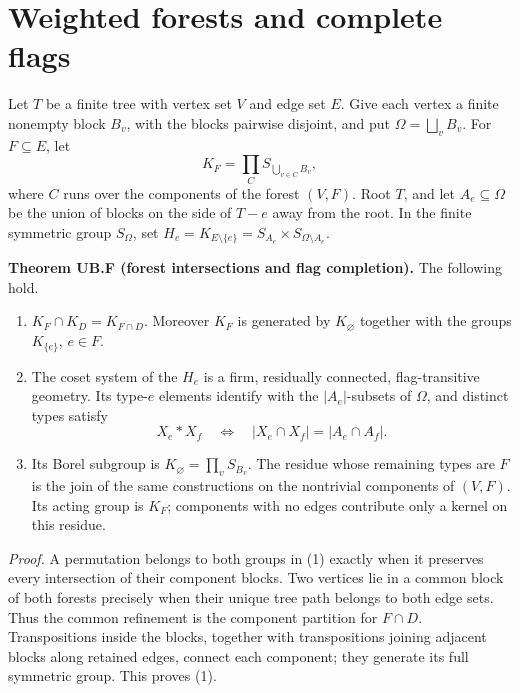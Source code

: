 \section{Weighted forests and complete flags}
Let \(T\) be a finite tree with vertex set \(V\) and edge set \(E\). Give each vertex a finite nonempty block \(B_v\), with the blocks pairwise disjoint, and put \(\Omega=\bigsqcup_vB_v\). For \(F\subseteq E\), let \begin{equation}
K_F=\prod_C S_{\bigcup_{v\in C}B_v},
\label{eq:03-forest:2-1}
\end{equation} where \(C\) runs over the components of the forest \((V,F)\). Root \(T\), and let \(A_e\subseteq\Omega\) be the union of blocks on the side of \(T-e\) away from the root. In the finite symmetric group \(S_\Omega\), set \(H_e=K_{E\setminus\{e\}}=S_{A_e}\times S_{\Omega\setminus A_e}\).

\textbf{Theorem UB.F (forest intersections and flag completion).} The following hold.

\begin{enumerate}
\def\labelenumi{\arabic{enumi}.}
\tightlist
\item
  \(K_F\cap K_D=K_{F\cap D}\). Moreover \(K_F\) is generated by \(K_\varnothing\) together with the groups \(K_{\{e\}}\), \(e\in F\).
\item
  The coset system of the \(H_e\) is a firm, residually connected, flag-transitive geometry. Its type-\(e\) elements identify with the \(|A_e|\)-subsets of \(\Omega\), and distinct types satisfy \begin{equation}
  X_e\mathrel{*}X_f\quad\Longleftrightarrow\quad
  |X_e\cap X_f|=|A_e\cap A_f|.
  \label{eq:03-forest:2-2}
  \end{equation}
\item
  Its Borel subgroup is \(K_\varnothing=\prod_vS_{B_v}\). The residue whose remaining types are \(F\) is the join of the same constructions on the nontrivial components of \((V,F)\). Its acting group is \(K_F\); components with no edges contribute only a kernel on this residue.
\end{enumerate}

\emph{Proof.} A permutation belongs to both groups in (1) exactly when it preserves every intersection of their component blocks. Two vertices lie in a common block of both forests precisely when their unique tree path belongs to both edge sets. Thus the common refinement is the component partition for \(F\cap D\). Transpositions inside the blocks, together with transpositions joining adjacent blocks along retained edges, connect each component; they generate its full symmetric group. This proves (1).

